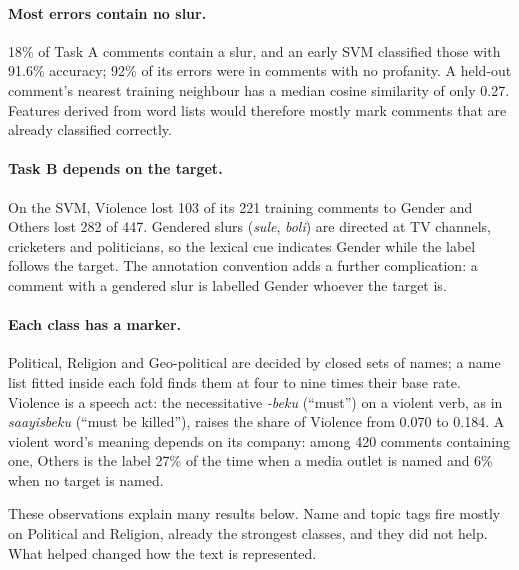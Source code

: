 \documentclass[11pt]{article}
\newcommand{\taska}{Task A}
\newcommand{\taskb}{Task B}
\begin{document}
\paragraph{Most errors contain no slur.} 18\% of \taska{} comments contain a slur,
and an early SVM classified those with 91.6\% accuracy; 92\% of its errors were in comments with
no profanity. A held-out comment's nearest training neighbour has a median
cosine similarity of only 0.27. Features derived from word lists would
therefore mostly mark comments that are already classified correctly.

\paragraph{\taskb{} depends on the target.} On the SVM, Violence lost 103 of its 221
training comments to Gender and Others lost 282 of 447. Gendered slurs
(\textit{sule}, \textit{boli}) are directed at TV channels, cricketers and
politicians, so the lexical cue indicates Gender while the label follows the
target. The annotation convention adds a further complication: a comment with a gendered slur is labelled
Gender whoever the target is.

\paragraph{Each class has a marker.} Political, Religion and Geo-political are
decided by closed sets of names; a name list fitted inside each fold finds them
at four to nine times their base rate. Violence is a speech act: the
necessitative \textit{-beku} (``must'') on a violent verb, as in
\textit{saayisbeku} (``must be killed''), raises the share of Violence from 0.070
to 0.184. A violent word's meaning depends on its company: among 420 comments
containing one, Others is the label 27\% of the time when a media outlet is named
and 6\% when no target is named.

These observations explain many results below. Name and topic tags fire mostly
on Political and Religion, already the strongest classes, and they did not help.
What helped changed how the text is represented.
\end{document}
